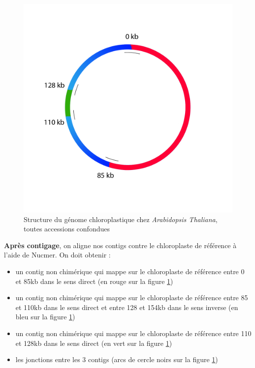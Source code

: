 \documentclass[a4paper]{article}
\begin{document}
\begin{figure}[!ht]
\centering
\includegraphics[scale=0.8] {Assemblage/schemachloro.png}
\caption{Structure du génome chloroplastique chez \textit{Arabidopsis Thaliana}, toutes accessions confondues}
\label{schemachloro}
\end{figure}

\textbf{Après contigage}, on aligne nos contigs contre le chloroplaste de référence à l'aide de Nucmer.  On doit obtenir :
\begin{itemize}
\item un contig non chimérique qui mappe sur le chloroplaste de référence entre 0 et 85kb dans le sens direct (en rouge sur la figure \ref{schemachloro})
\item un contig non chimérique  qui mappe sur le chloroplaste de référence entre 85 et 110kb dans le sens direct et entre 128 et 154kb dans le sens inverse (en bleu sur la figure \ref{schemachloro})
\item un contig non chimérique  qui mappe sur le chloroplaste de référence entre 110 et 128kb dans le sens direct (en vert sur la figure \ref{schemachloro})
\item les jonctions entre les 3 contigs (arcs de cercle noirs sur la figure \ref{schemachloro})
\end{itemize}
\end{document}
